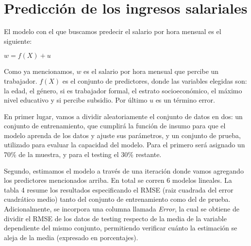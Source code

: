 \documentclass[11pt,oneside]{article}
\begin{document}
	
	
	
	
	\section{Predicción de los ingresos salariales}
	
	El modelo con el que buscamos predecir el salario por hora mensual es el siguiente:
	
	\begin{center}
		$w = f(X) + u$
	\end{center}
	
	Como ya mencionamos, $w$ es el salario por hora mensual que percibe un trabajador. $f(X)$ es el conjunto de predictores, donde las variables elegidas son: la edad, el género, si es trabajador formal, el estrato socioeconómico, el máximo nivel educativo y si percibe subsidio. Por último $u$ es un término error.
	
	En primer lugar, vamos a dividir aleatoriamente el conjunto de datos en dos: un conjunto de entrenamiento, que cumplirá la función de insumo para que el modelo aprenda de los datos y ajuste sus parámetros, y un conjunto de prueba, utilizado para evaluar la capacidad del modelo. Para el primero será asignado un 70\% de la muestra, y para el testing el 30\% restante.
	
	Segundo, estimamos el modelo a través de una iteración donde vamos agregando los predictores mencionados arriba. En total se corren 6 modelos lineales. La tabla 4 resume los resultados especificando el RMSE (raiz cuadrada del error cuadrático medio) tanto del conjunto de entrenamiento como del de prueba. Adicionalmente, se incorpora una columna llamada \textit{Error}, la cual se obtiene de dividir el RMSE de los datos de testing respecto de la media de la variable dependiente del mismo conjunto, permitiendo verificar cuánto la estimación se aleja de la media (expresado en porcentajes). 
	
\end{document}
